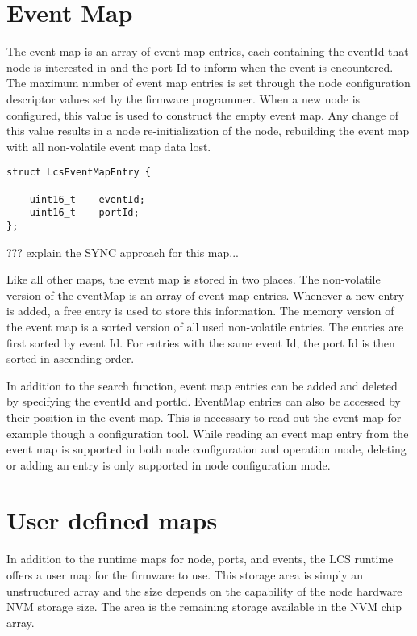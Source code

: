 \section{Event Map}

The event map is an array of event map entries, each containing the eventId that node is interested in and the port Id to inform when the event is encountered. The maximum number of event map entries is set through the node configuration descriptor values set by the firmware programmer. When a new node is configured, this value is used to construct the empty event map. Any change of this value results in a node re-initialization of the node, rebuilding the event map with all non-volatile event map data lost.

\lstset{language=c++, style=codesnippetstyle}
\begin{lstlisting}
struct LcsEventMapEntry {

    uint16_t	eventId;
    uint16_t 	portId;
};
\end{lstlisting}

??? explain the SYNC approach for this map...

Like all other maps, the event map is stored in two places. The non-volatile version of the eventMap is an array of event map entries. Whenever a new entry is added, a free entry is used to store this information. The memory version of the event map is a sorted version of all used non-volatile entries. The entries are first sorted by event Id. For entries with the same event Id, the port Id is then sorted in ascending order.

In addition to the search function, event map entries can be added and deleted by specifying the eventId and portId. EventMap entries can also be accessed by their position in the event map. This is necessary to read out the event map for example though a configuration tool. While reading an event map entry from the event map is supported in both node configuration and operation mode, deleting or adding an entry is only supported in node configuration mode.

\section{User defined maps}

In addition to the runtime maps for node, ports, and events, the LCS runtime offers a user map for the firmware to use. This storage area is simply an unstructured array and the size depends on the capability of the node hardware NVM storage size. The area is the remaining storage available in the NVM chip array.

